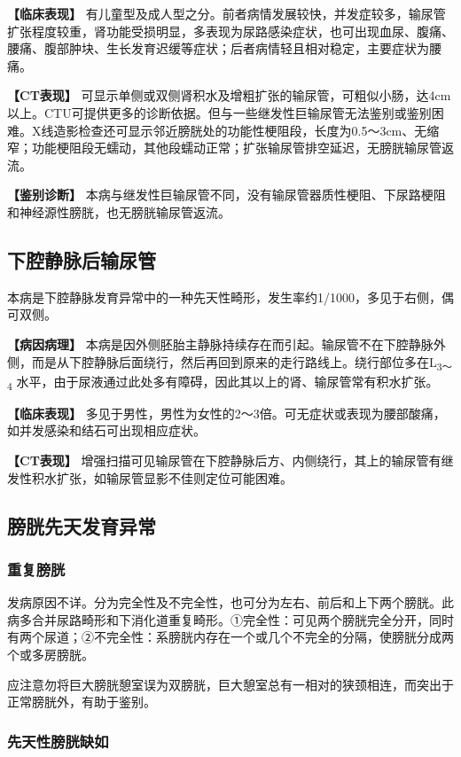 \textbf{【临床表现】}
有儿童型及成人型之分。前者病情发展较快，并发症较多，输尿管扩张程度较重，肾功能受损明显，多表现为尿路感染症状，也可出现血尿、腹痛、腰痛、腹部肿块、生长发育迟缓等症状；后者病情轻且相对稳定，主要症状为腰痛。

\textbf{【CT表现】}
可显示单侧或双侧肾积水及增粗扩张的输尿管，可粗似小肠，达4cm以上。CTU可提供更多的诊断依据。但与一些继发性巨输尿管无法鉴别或鉴别困难。X线造影检查还可显示邻近膀胱处的功能性梗阻段，长度为0.5～3cm、无缩窄；功能梗阻段无蠕动，其他段蠕动正常；扩张输尿管排空延迟，无膀胱输尿管返流。

\textbf{【鉴别诊断】}
本病与继发性巨输尿管不同，没有输尿管器质性梗阻、下尿路梗阻和神经源性膀胱，也无膀胱输尿管返流。

\subsection{下腔静脉后输尿管}

本病是下腔静脉发育异常中的一种先天性畸形，发生率约1/1000，多见于右侧，偶可双侧。

\textbf{【病因病理】}
本病是因外侧胚胎主静脉持续存在而引起。输尿管不在下腔静脉外侧，而是从下腔静脉后面绕行，然后再回到原来的走行路线上。绕行部位多在L\textsubscript{3～4}
水平，由于尿液通过此处多有障碍，因此其以上的肾、输尿管常有积水扩张。

\textbf{【临床表现】}
多见于男性，男性为女性的2～3倍。可无症状或表现为腰部酸痛，如并发感染和结石可出现相应症状。

\textbf{【CT表现】}
增强扫描可见输尿管在下腔静脉后方、内侧绕行，其上的输尿管有继发性积水扩张，如输尿管显影不佳则定位可能困难。

\subsection{膀胱先天发育异常}

\subsubsection{重复膀胱}

发病原因不详。分为完全性及不完全性，也可分为左右、前后和上下两个膀胱。此病多合并尿路畸形和下消化道重复畸形。①完全性：可见两个膀胱完全分开，同时有两个尿道；②不完全性：系膀胱内存在一个或几个不完全的分隔，使膀胱分成两个或多房膀胱。

应注意勿将巨大膀胱憩室误为双膀胱，巨大憩室总有一相对的狭颈相连，而突出于正常膀胱外，有助于鉴别。

\subsubsection{先天性膀胱缺如}

